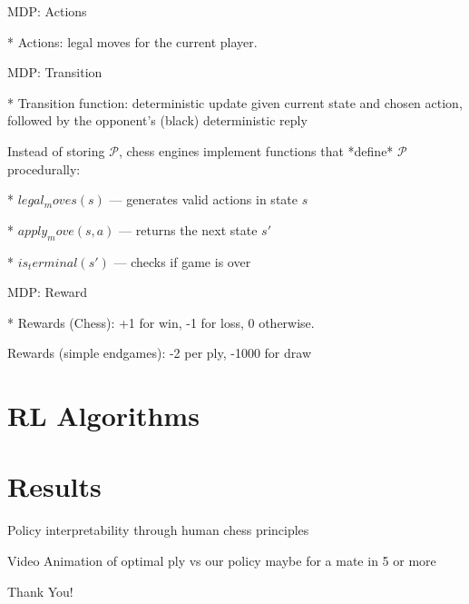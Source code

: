 \documentclass[12pt]{beamer}
\begin{document}
\begin{frame}{MDP: Actions}

  * Actions: legal moves for the current player.
  
\end{frame}

\begin{frame}{MDP: Transition}

  * Transition function: deterministic update given current state and chosen action, followed by the opponent's (black) deterministic reply

  Instead of storing $\mathcal{P}$, chess engines implement functions that *define* $\mathcal{P}$ procedurally:
      
  * $legal_moves(s)$ — generates valid actions in state $s$
  
  * $apply_move(s, a)$ — returns the next state $s'$
  
  * $is_terminal(s')$ — checks if game is over


\end{frame}


\begin{frame}{MDP: Reward}

  * Rewards (Chess): +1 for win, -1 for loss, 0 otherwise.

    Rewards (simple endgames): -2 per ply, -1000 for draw

\end{frame}

\section{RL Algorithms}

\section{Results}

\begin{frame}{Policy interpretability through human chess principles}
  
\end{frame}

\begin{frame}{Video Animation of optimal ply vs our policy
}
  maybe for a mate in 5 or more

\end{frame}


{
\begin{frame}[standout]
\thispagestyle{empty}
  {\LARGE Thank You!}
\end{frame}
}
\end{document}
